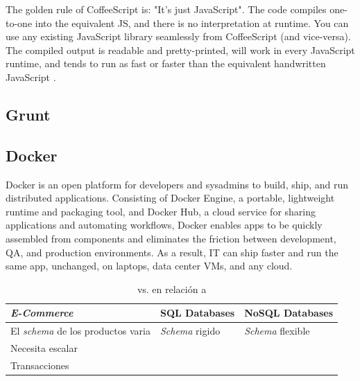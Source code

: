 	The golden rule of CoffeeScript is: "It's just JavaScript". The code compiles one-to-one into the equivalent JS, and there is no interpretation at runtime. You can use any existing JavaScript library seamlessly from CoffeeScript (and vice-versa). The compiled output is readable and pretty-printed, will work in every JavaScript runtime, and tends to run as fast or faster than the equivalent handwritten JavaScript \cite{technology_coffeescript}.
	
	\subsection{Grunt} 
	\cite{technology_gruntjs}
	
	\subsection{Docker}
	Docker is an open platform for developers and sysadmins to build, ship, and run distributed applications. Consisting of Docker Engine, a portable, lightweight runtime and packaging tool, and Docker Hub, a cloud service for sharing applications and automating workflows, Docker enables apps to be quickly assembled from components and eliminates the friction between development, QA, and production environments. As a result, IT can ship faster and run the same app, unchanged, on laptops, data center VMs, and any cloud\cite{technology_docker}.
	
	




\begin{table}[h!]
    \tiny
   
\begin{tabular}{ |L{0.1\paperwidth}|L{0.3\paperwidth}|L{0.3\paperwidth}|}
\hline
	\textit{E-Commerce}&
	SQL Databases &
	NoSQL Databases
 
\\ \hline
	El \textit{schema} de los productos varia&
	\textit{Schema} rigido&
	\textit{Schema} flexible
\\ \hline
	Necesita escalar&
	&
	
\\ \hline
	Transacciones&
	&
	
\\ \hline
\end{tabular}
    \caption{  vs.  en relación a \textit{}}
    \label{tab:SQL_vs_noSQL_summary}
\end{table}

